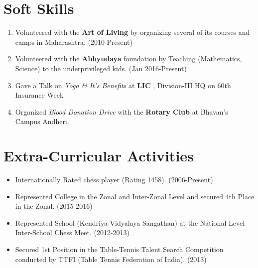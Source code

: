 \documentclass[10pt,a4paper,sans]{moderncv} %
\begin{document}


\section{Soft Skills}
\begin{enumerate}
\item Volunteered with the\textbf{ Art of Living} by organizing several of its courses and camps in Maharashtra.        (2010-Present) 
\item Volunteered with the \textbf{Abhyudaya} foundation by Teaching (Mathematics, Science) to the underprivileged kids. (Jan 2016-Present) 
\item Gave a Talk on \textit{Yoga \& It's Benefits} at \textbf{LIC }, Division-III HQ on 60th Insurance Week 
\item Organized \textit{Blood Donation Drive} with the \textbf{Rotary Club} at Bhavan's Campus Andheri.
\end{enumerate}



\section{Extra-Curricular Activities}

\begin{itemize}
\item Internationally Rated chess player (Rating 1458).    (2006-Present) 
\item Represented College in the Zonal and Inter-Zonal Level and secured 4th Place in the Zonal.         (2015-2016) 
\item Represented School (Kendriya Vidyalaya Sangathan) at the National Level Inter-School Chess Meet.                                   (2012-2013)  
\item Secured 1st Position in the Table-Tennis Talent Search Competition conducted by TTFI (Table Tennis Federation of India).                      (2013) 
\end {itemize}


\end{document}
